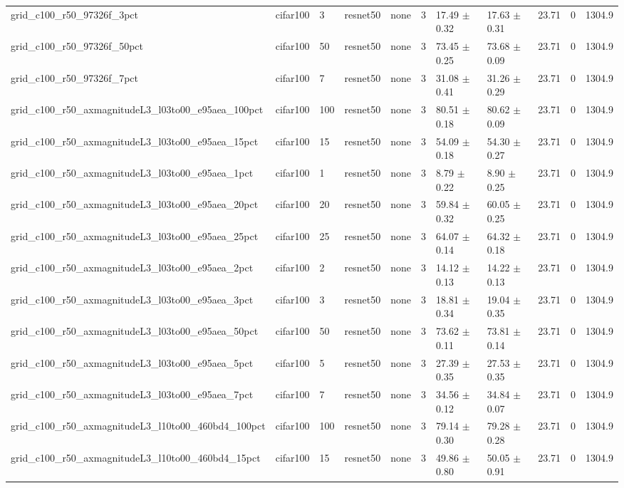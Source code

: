 \begin{tabular}{lllllllllll}
grid_c100_r50_97326f_3pct & cifar100 & 3 & resnet50 & none & 3 & 17.49 $\pm$ 0.32 & 17.63 $\pm$ 0.31 & 23.71 & 0 & 1304.9 \\
grid_c100_r50_97326f_50pct & cifar100 & 50 & resnet50 & none & 3 & 73.45 $\pm$ 0.25 & 73.68 $\pm$ 0.09 & 23.71 & 0 & 1304.9 \\
grid_c100_r50_97326f_7pct & cifar100 & 7 & resnet50 & none & 3 & 31.08 $\pm$ 0.41 & 31.26 $\pm$ 0.29 & 23.71 & 0 & 1304.9 \\
grid_c100_r50_axmagnitudeL3_l03to00_e95aea_100pct & cifar100 & 100 & resnet50 & none & 3 & 80.51 $\pm$ 0.18 & 80.62 $\pm$ 0.09 & 23.71 & 0 & 1304.9 \\
grid_c100_r50_axmagnitudeL3_l03to00_e95aea_15pct & cifar100 & 15 & resnet50 & none & 3 & 54.09 $\pm$ 0.18 & 54.30 $\pm$ 0.27 & 23.71 & 0 & 1304.9 \\
grid_c100_r50_axmagnitudeL3_l03to00_e95aea_1pct & cifar100 & 1 & resnet50 & none & 3 & 8.79 $\pm$ 0.22 & 8.90 $\pm$ 0.25 & 23.71 & 0 & 1304.9 \\
grid_c100_r50_axmagnitudeL3_l03to00_e95aea_20pct & cifar100 & 20 & resnet50 & none & 3 & 59.84 $\pm$ 0.32 & 60.05 $\pm$ 0.25 & 23.71 & 0 & 1304.9 \\
grid_c100_r50_axmagnitudeL3_l03to00_e95aea_25pct & cifar100 & 25 & resnet50 & none & 3 & 64.07 $\pm$ 0.14 & 64.32 $\pm$ 0.18 & 23.71 & 0 & 1304.9 \\
grid_c100_r50_axmagnitudeL3_l03to00_e95aea_2pct & cifar100 & 2 & resnet50 & none & 3 & 14.12 $\pm$ 0.13 & 14.22 $\pm$ 0.13 & 23.71 & 0 & 1304.9 \\
grid_c100_r50_axmagnitudeL3_l03to00_e95aea_3pct & cifar100 & 3 & resnet50 & none & 3 & 18.81 $\pm$ 0.34 & 19.04 $\pm$ 0.35 & 23.71 & 0 & 1304.9 \\
grid_c100_r50_axmagnitudeL3_l03to00_e95aea_50pct & cifar100 & 50 & resnet50 & none & 3 & 73.62 $\pm$ 0.11 & 73.81 $\pm$ 0.14 & 23.71 & 0 & 1304.9 \\
grid_c100_r50_axmagnitudeL3_l03to00_e95aea_5pct & cifar100 & 5 & resnet50 & none & 3 & 27.39 $\pm$ 0.35 & 27.53 $\pm$ 0.35 & 23.71 & 0 & 1304.9 \\
grid_c100_r50_axmagnitudeL3_l03to00_e95aea_7pct & cifar100 & 7 & resnet50 & none & 3 & 34.56 $\pm$ 0.12 & 34.84 $\pm$ 0.07 & 23.71 & 0 & 1304.9 \\
grid_c100_r50_axmagnitudeL3_l10to00_460bd4_100pct & cifar100 & 100 & resnet50 & none & 3 & 79.14 $\pm$ 0.30 & 79.28 $\pm$ 0.28 & 23.71 & 0 & 1304.9 \\
grid_c100_r50_axmagnitudeL3_l10to00_460bd4_15pct & cifar100 & 15 & resnet50 & none & 3 & 49.86 $\pm$ 0.80 & 50.05 $\pm$ 0.91 & 23.71 & 0 & 1304.9 \\

\end{tabular}
